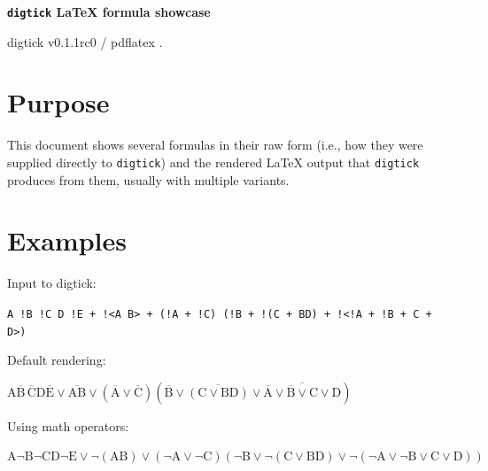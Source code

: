 \documentclass{article}
\begin{document}
\newcommand{\bnot}[1]{\overline{#1}}
\newcommand{\bnand}{\ \stackon[-5pt]{$\wedge$}{$\sim$}\ }
\newcommand{\bnor}{\ \stackon[-5pt]{$\vee$}{$\sim$}\ }

\setlength{\parindent}{0pt}


\begin{center}
	{\LARGE\bfseries \texttt{digtick} {\LaTeX} formula showcase}\par
	\vspace{0.5em}
	{\large digtick v0.1.1rc0 / pdflatex {\the\pdftexversion.\pdftexrevision} \fmtversion}
\end{center}

\section{Purpose}
This document shows several formulas in their raw form (i.e., how they were supplied directly to \texttt{digtick}) and the rendered {\LaTeX} output that \texttt{digtick} produces from them, usually with multiple variants.

\section{Examples}

\begin{minipage}{\linewidth}
Input to digtick:
\begin{sourcebox}\texttt{A !B !C D !E + !<A B> + (!A + !C) (!B + !(C + BD) + !<!A + !B + C + D>)}\end{sourcebox}
Default rendering:
\begin{renderedbox}$\mathrm{A \bnot{B}\,\bnot{C} D \bnot{E} \vee \bnot{A B} \vee (\bnot{A} \vee \bnot{C}) (\bnot{B} \vee \bnot{(C \vee BD)} \vee \bnot{\bnot{A} \vee \bnot{B} \vee C \vee D})}$\end{renderedbox}
Using math operators:
\begin{renderedbox}$\mathrm{A \neg B \neg C D \neg E \vee \neg (A B) \vee (\neg A \vee \neg C) (\neg B \vee \neg (C \vee BD) \vee \neg (\neg A \vee \neg B \vee C \vee D))}$\end{renderedbox}
\end{minipage}
\vspace{2cm}
\end{document}
